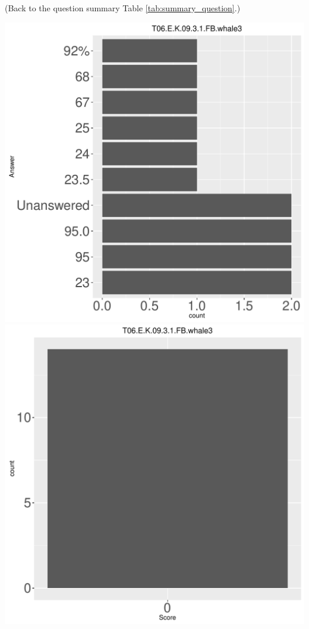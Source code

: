 \documentclass[12pt,english,nohyper]{tufte-handout}\usepackage[]{graphicx}\usepackage[]{color}
\begin{document}
 (Back to the question summary Table \ref{tab:summary_question}.)

\begin{center} \includegraphics[width=.45\linewidth]{Topic06_AB_29_answer} \includegraphics[width=.45\linewidth]{Topic06_AB_29_score} \end{center} 
\end{document}
